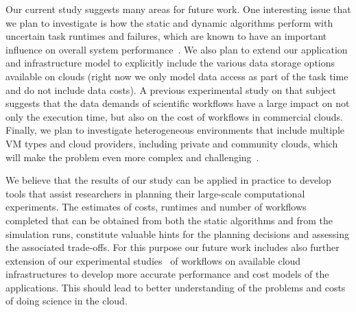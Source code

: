 \documentclass[conference]{IEEEtran}
\begin{document}
Our current study suggests many areas for future work. One interesting
issue that we plan to investigate is how the static and dynamic algorithms
perform with uncertain task runtimes and failures, which are known to have
an important influence on overall system performance~\cite{Sakellariou2010,Dongarra2007}.
We also plan to extend our application and infrastructure model to explicitly
include the various data storage options available on clouds (right now we only
model data access as part of the task time and do not include data costs). A previous
experimental study on that subject~\cite{Juve2010} suggests that the data
demands of scientific workflows have a large impact on not only the
execution time, but also on the cost of workflows in commercial clouds.
Finally, we plan to investigate heterogeneous environments that include
multiple VM types and cloud providers, including private and community clouds,
which will make the problem even more complex and challenging~\cite{Marshall2010, Vockler2011, Juve2010}.

We believe that the results of our study can be applied in practice to develop
tools that assist researchers in planning their large-scale computational
experiments. The estimates of costs, runtimes and number of workflows completed
that can be obtained from both the static algorithms and from the simulation
runs, constitute valuable hints for the planning decisions and assessing the
associated trade-offs. For this purpose our future work includes also further
extension of our experimental studies~\cite{Juve2009, Vockler2011} of workflows on
available cloud infrastructures to develop more accurate performance and cost
models of the applications. This should lead to better understanding of the
problems and costs of doing science in the cloud.



%





\end{document}
